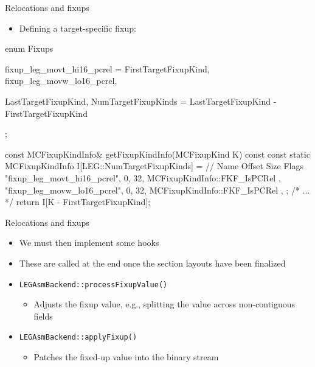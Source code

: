 
\begin{frame}[fragile]{Relocations and fixups}

\begin{itemize}
    \item Defining a target-specific fixup:
\end{itemize}

\begin{codebox}
enum Fixups {
  fixup_leg_movt_hi16_pcrel = FirstTargetFixupKind,
  fixup_leg_movw_lo16_pcrel,
  
  LastTargetFixupKind,
  NumTargetFixupKinds = LastTargetFixupKind - FirstTargetFixupKind
};
\end{codebox}

\begin{codebox}
const MCFixupKindInfo& getFixupKindInfo(MCFixupKind K) const {
  const static MCFixupKindInfo I[LEG::NumTargetFixupKinds] = {
    // Name          Offset Size Flags
    { "fixup_leg_movt_hi16_pcrel", 0,  32, MCFixupKindInfo::FKF_IsPCRel },
    { "fixup_leg_movw_lo16_pcrel", 0,  32, MCFixupKindInfo::FKF_IsPCRel },
  };
  /* ... */
  return I[K - FirstTargetFixupKind];
}
\end{codebox}

\end{frame}


\begin{frame}{Relocations and fixups}

\begin{itemize}
    \item We must then implement some hooks
    \item These are called at the end once the section layouts have been finalized
    \item \texttt{LEGAsmBackend::processFixupValue()}
    \begin{itemize}
        \item Adjusts the fixup value, e.g., splitting the value across non-contiguous fields
    \end{itemize}
    \item \texttt{LEGAsmBackend::applyFixup()}
    \begin{itemize}
        \item Patches the fixed-up value into the binary stream
    \end{itemize}
\end{itemize}

\end{frame}

